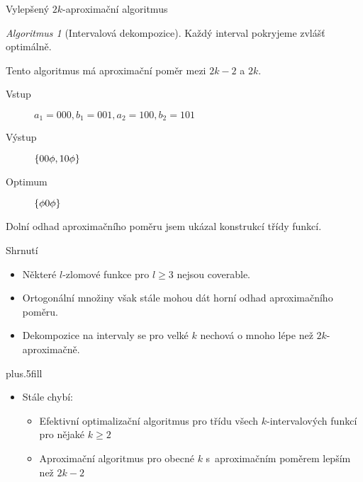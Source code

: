 \documentclass{beamer}
\theoremstyle{remark}
\newtheorem{algorithm}{Algoritmus}
\begin{document}
\begin{frame}{Vylepšený $2k$-aproximační algoritmus}
\begin{algorithm}[Intervalová dekompozice]
Každý interval pokryjeme zvlášť optimálně.
\end{algorithm}

Tento algoritmus má aproximační poměr mezi $2k-2$ a $2k$.

\begin{example}
\begin{description}
\item[Vstup]
$a_1 = 000, b_1 = 001, a_2 = 100, b_2 = 101$

\item[Výstup]
$\{00 \phi, 10 \phi\}$

\item[Optimum]
$\{\phi 0 \phi\}$
\end{description}
\end{example}

Dolní odhad aproximačního poměru jsem ukázal konstrukcí třídy  funkcí.
\end{frame}

\begin{frame}{Shrnutí}

  \begin{itemize}
  \item
    Některé $l$-zlomové funkce pro $l \geq 3$ nejsou coverable.
  \item
    Ortogonální množiny však stále mohou dát horní odhad aproximačního poměru.
  \item
    Dekompozice na intervaly se pro velké $k$ nechová o mnoho lépe než $2k$-aproximačně.
  \end{itemize}
  
  \vskip0pt plus.5fill
  \begin{itemize}
  \item
    Stále chybí:
    \begin{itemize}
    \item
      Efektivní optimalizační algoritmus pro třídu všech $k$-intervalových funkcí pro nějaké $k \geq 2$
    \item
      Aproximační algoritmus pro obecné $k$ s~aproximačním poměrem lepším než $2k-2$
    \end{itemize}
  \end{itemize}
\end{frame}
\end{document}
